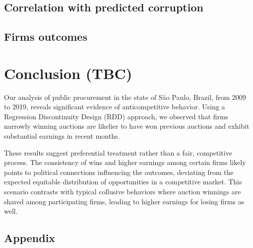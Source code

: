 \documentclass[12 pt]{elsarticle}
\begin{document}
\subsection{Correlation with predicted corruption}
\subsection{Firms outcomes}

\section{Conclusion (TBC)}\label{concl}
Our analysis of public procurement in the state of São Paulo, Brazil, from 2009 to 2019, reveals significant evidence of anticompetitive behavior. Using a Regression Discontinuity Design (RDD) approach, we observed that firms narrowly winning auctions are likelier to have won previous auctions and exhibit substantial earnings in recent months.

These results suggest preferential treatment rather than a fair, competitive process. The consistency of wins and higher earnings among certain firms likely points to political connections influencing the outcomes, deviating from the expected equitable distribution of opportunities in a competitive market. This scenario contrasts with typical collusive behaviors where auction winnings are shared among participating firms, leading to higher earnings for losing firms as well.


\clearpage
 \newpage


\newpage


\begin{subappendices}
\setcounter{table}{0} 
\setcounter{section}{0}
\setcounter{equation}{0} 
\setcounter{figure}{0} 
\renewcommand{\thetable}{\Alph{section}.\arabic{table}}
\renewcommand{\thesection}{\Alph{section}}
\renewcommand{\thesubsection}{\Alph{section}.\arabic{subsection}}
\renewcommand{\thefigure}{\Alph{section}.\arabic{figure}}

\clearpage

\section{Appendix}\label{ApA}

\end{subappendices}
\end{document}
